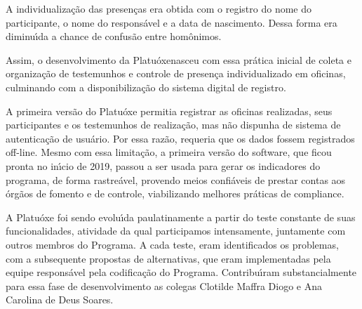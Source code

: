 \documentclass[
12pt,		%
openright,	%
twoside,  %
a4paper,			%
chapter=TITLE,		%
english,			%
french,				%
spanish,			%
brazil				%
]{USPSC-classe/USPSC}
\begin{document}
A individualiza\c{c}\~ao das presen\c{c}as era obtida com o registro do nome do participante, o nome do respons\'avel e a data de nascimento. Dessa forma era diminu\'{\i}da a chance de confus\~ao entre hom\^onimos.

















Assim, o desenvolvimento da \textquotedbl Platu\'oxe\textquotedbl  nasceu com essa pr\'atica inicial de coleta e organiza\c{c}\~ao de testemunhos e controle de presen\c{c}a individualizado em oficinas, culminando com a disponibiliza\c{c}\~ao do sistema digital de registro.

















A primeira vers\~ao do Platu\'oxe permitia registrar as oficinas realizadas, seus participantes e os testemunhos de realiza\c{c}\~ao, mas n\~ao dispunha de sistema de autentica\c{c}\~ao de usu\'ario. Por essa raz\~ao, requeria que os dados fossem registrados off-line. Mesmo com essa limita\c{c}\~ao, a primeira vers\~ao do software, que ficou pronta no in\'{\i}cio de 2019, passou a ser usada para gerar os indicadores do programa, de forma rastre\'avel, provendo meios confi\'aveis de prestar contas aos \'org\~aos de fomento e de controle, viabilizando melhores pr\'aticas de \textquotedbl compliance\textquotedbl .

















A Platu\'oxe foi sendo evolu\'{\i}da paulatinamente a partir do teste constante de suas funcionalidades, atividade da qual participamos intensamente, juntamente com outros membros do Programa. A cada teste, eram identificados os problemas, com a subsequente propostas de alternativas, que eram implementadas pela equipe respons\'avel pela codifica\c{c}\~ao do Programa. Contribu\'{\i}ram substancialmente para essa fase de desenvolvimento as colegas Clotilde Maffra Diogo e Ana Carolina de Deus Soares.
\end{document}
